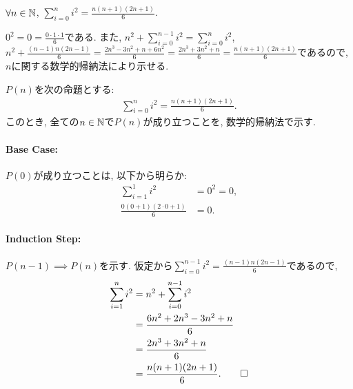 \begin{prop}
  \label{p:20230705}
  $\forall n\in\mathbb{N}$, $\sum_{i=0}^{n}i^2=\frac{n(n+1)(2n+1)}{6}$.
\end{prop}
\begin{proof**}
  $0^2=0=\frac{0\cdot 1\cdot 1}{6}$である.
  また,
  $n^2+\sum_{i=0}^{n-1}i^2=\sum_{i=0}^{n}i^2$,
  $n^2+\frac{(n-1)n(2n-1)}{6}=\frac{2n^3-3n^2+n+6n^2}{6}=\frac{2n^3+3n^2+n}{6}=\frac{n(n+1)(2n+1)}{6}$であるので,
  $n$に関する数学的帰納法により示せる.
\end{proof**}


\begin{proof*}
  $P(n)$を次の命題とする:
  \begin{align*}
    \sum_{i=0}^{n}i^2=\frac{n(n+1)(2n+1)}{6}.
  \end{align*}
  このとき,
  全ての$n\in\mathbb{N}$で$P(n)$が成り立つことを,
  数学的帰納法で示す.

  \paragraph{Base Case:}
  $P(0)$が成り立つことは, 以下から明らか:
  \begin{align*}
    \sum_{i=1}^{1}i^2&=0^2=0,\\
    \frac{0(0+1)(2\cdot 0+1)}{6}&=0.
  \end{align*}

  \paragraph{Induction Step:}
  $P(n-1)\implies P(n)$を示す.
  仮定から$\sum_{i=0}^{n-1}i^2=\frac{(n-1)n(2n-1)}{6}$であるので,
  \begin{align*}
    \sum_{i=1}^{n}i^2&=n^2+\sum_{i=0}^{n-1}i^2\\
    &=\frac{6n^2+2n^3-3n^2+n}{6}\\
    &=\frac{2n^3+3n^2+n}{6}\\
    &=\frac{n(n+1)(2n+1)}{6}
    .\qedhere
  \end{align*}
\end{proof*}

